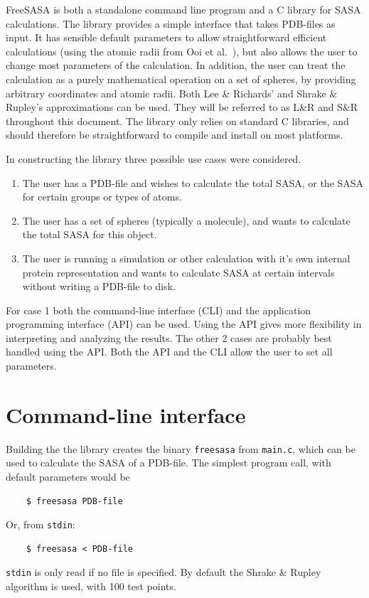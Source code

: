 \documentclass[a4paper,11pt]{article}
\begin{document}
FreeSASA is both a standalone command line program and a C library for
SASA calculations. The library provides a simple interface that takes
PDB-files as input. It has sensible default parameters to allow
straightforward efficient calculations (using the atomic radii from
Ooi et al.~\cite{OONS}), but also allows the user to change most
parameters of the calculation. In addition, the user can treat the
calculation as a purely mathematical operation on a set of spheres, by
providing arbitrary coordinates and atomic radii. Both Lee \&
Richards' \cite{LnR} and Shrake \& Rupley's \cite{SnR} approximations
can be used. They will be referred to as L\&R and S\&R throughout this
document. The library only relies on standard C libraries, and should
therefore be straightforward to compile and install on most platforms.

In constructing the library three possible use cases were considered. 
\begin{enumerate}
\item The user has a PDB-file and wishes to calculate the total SASA, 
  or the SASA for certain groups or types of atoms.
\item The user has a set of spheres (typically a molecule), and wants
  to calculate the total SASA for this object.
\item The user is running a simulation or other calculation with it's
  own internal protein representation and wants to calculate SASA at
  certain intervals without writing a PDB-file to disk.
\end{enumerate}
For case 1 both the command-line interface (CLI) and the application
programming interface (API) can be used. Using the API gives more
flexibility in interpreting and analyzing the results. The other 2
cases are probably best handled using the API. Both the API and the
CLI allow the user to set all parameters.

\section{Command-line interface}\label{sec:cli}

Building the the library creates the binary \verb|freesasa| from
\verb|main.c|, which can be used to calculate the SASA of a
PDB-file. The simplest program call, with default parameters would be
\begin{verbatim}
    $ freesasa PDB-file
\end{verbatim}
Or, from \verb|stdin|:
\begin{verbatim} 
    $ freesasa < PDB-file    
\end{verbatim}
\verb|stdin| is only read if no file is specified. By default the
Shrake \& Rupley algorithm is used, with 100 test points. 
\end{document}
